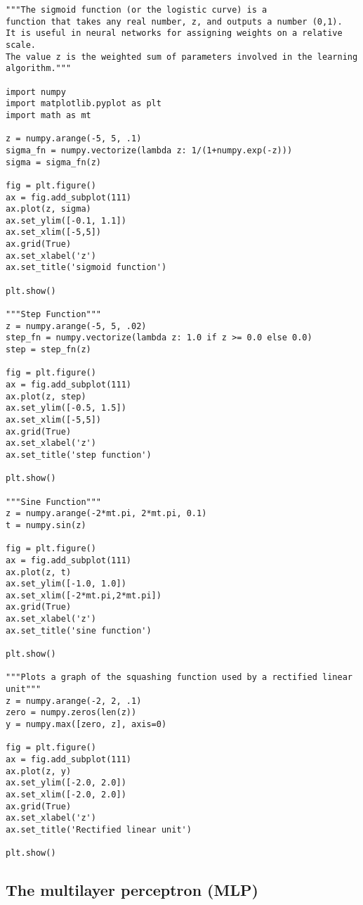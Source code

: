 \begin{verbatim}
"""The sigmoid function (or the logistic curve) is a 
function that takes any real number, z, and outputs a number (0,1).
It is useful in neural networks for assigning weights on a relative scale.
The value z is the weighted sum of parameters involved in the learning algorithm."""

import numpy
import matplotlib.pyplot as plt
import math as mt

z = numpy.arange(-5, 5, .1)
sigma_fn = numpy.vectorize(lambda z: 1/(1+numpy.exp(-z)))
sigma = sigma_fn(z)

fig = plt.figure()
ax = fig.add_subplot(111)
ax.plot(z, sigma)
ax.set_ylim([-0.1, 1.1])
ax.set_xlim([-5,5])
ax.grid(True)
ax.set_xlabel('z')
ax.set_title('sigmoid function')

plt.show()

"""Step Function"""
z = numpy.arange(-5, 5, .02)
step_fn = numpy.vectorize(lambda z: 1.0 if z >= 0.0 else 0.0)
step = step_fn(z)

fig = plt.figure()
ax = fig.add_subplot(111)
ax.plot(z, step)
ax.set_ylim([-0.5, 1.5])
ax.set_xlim([-5,5])
ax.grid(True)
ax.set_xlabel('z')
ax.set_title('step function')

plt.show()

"""Sine Function"""
z = numpy.arange(-2*mt.pi, 2*mt.pi, 0.1)
t = numpy.sin(z)

fig = plt.figure()
ax = fig.add_subplot(111)
ax.plot(z, t)
ax.set_ylim([-1.0, 1.0])
ax.set_xlim([-2*mt.pi,2*mt.pi])
ax.grid(True)
ax.set_xlabel('z')
ax.set_title('sine function')

plt.show()

"""Plots a graph of the squashing function used by a rectified linear
unit"""
z = numpy.arange(-2, 2, .1)
zero = numpy.zeros(len(z))
y = numpy.max([zero, z], axis=0)

fig = plt.figure()
ax = fig.add_subplot(111)
ax.plot(z, y)
ax.set_ylim([-2.0, 2.0])
ax.set_xlim([-2.0, 2.0])
ax.grid(True)
ax.set_xlabel('z')
ax.set_title('Rectified linear unit')

plt.show()

\end{verbatim}


\subsection*{The multilayer  perceptron (MLP)}

